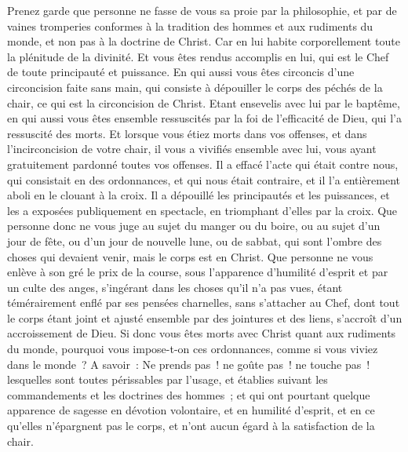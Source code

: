 \begin{multicols}{2}
Prenez garde que personne ne fasse de vous sa proie par la philosophie, et par de vaines tromperies conformes à la tradition des hommes et aux rudiments du monde, et non pas à la doctrine de Christ.
Car en lui habite corporellement toute la plénitude de la divinité.
Et vous êtes rendus accomplis en lui, qui est le Chef de toute principauté et puissance.
En qui aussi vous êtes circoncis d'une circoncision faite sans main, qui consiste à dépouiller le corps des péchés de la chair, ce qui est la circoncision de Christ.
Etant ensevelis avec lui par le baptême, en qui aussi vous êtes ensemble ressuscités par la foi de l'efficacité de Dieu, qui l'a ressuscité des morts.
Et lorsque vous étiez morts dans vos offenses, et dans l'incirconcision de votre chair, il vous a vivifiés ensemble avec lui, vous ayant gratuitement pardonné toutes vos offenses.
Il a effacé l'acte qui était contre nous, qui consistait en des ordonnances, et qui nous était contraire, et il l'a entièrement aboli en le clouant à la croix.
Il a dépouillé les principautés et les puissances, et les a exposées publiquement en spectacle, en triomphant d'elles par la croix.
Que personne donc ne vous juge au sujet du manger ou du boire, ou au sujet d'un jour de fête, ou d'un jour de nouvelle lune, ou de sabbat,
qui sont l'ombre des choses qui devaient venir, mais le corps est en Christ.
Que personne ne vous enlève à son gré le prix de la course, sous l'apparence d'humilité d'esprit et par un culte des anges, s'ingérant dans les choses qu'il n'a pas vues, étant témérairement enflé par ses pensées charnelles,
sans s'attacher au Chef, dont tout le corps étant joint et ajusté ensemble par des jointures et des liens, s'accroît d'un accroissement de Dieu.
Si donc vous êtes morts avec Christ quant aux rudiments du monde, pourquoi vous impose-t-on ces ordonnances, comme si vous viviez dans le monde~?
A savoir~: Ne prends pas~! ne goûte pas~! ne touche pas~!
lesquelles sont toutes périssables par l'usage, et établies suivant les commandements et les doctrines des hommes~; 
et qui ont pourtant quelque apparence de sagesse en dévotion volontaire, et en humilité d'esprit, et en ce qu'elles n'épargnent pas le corps, et n'ont aucun égard à la satisfaction de la chair.

\end{multicols}
